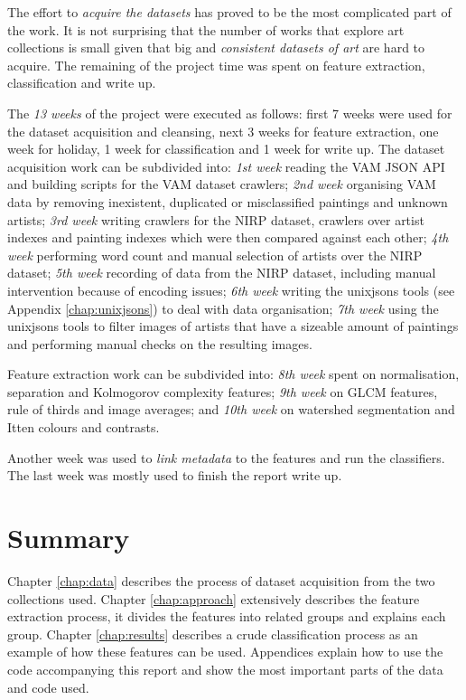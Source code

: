 \documentclass[11pt,a4paper,twoside,openright]{report}
\begin{document}
The effort to \emph{acquire the datasets} has proved to be the most complicated
part of the work.  It is not surprising that the number of works that explore
art collections is small given that big and \emph{consistent datasets of art}
are hard to acquire.  The remaining of the project time was spent on feature
extraction, classification and write up.

The \emph{13 weeks} of the project were executed as follows: first 7 weeks were
used for the dataset acquisition and cleansing, next 3 weeks for feature
extraction, one week for holiday, 1 week for classification and 1 week for
write up.  The dataset acquisition work can be subdivided into: \emph{1st week}
reading the VAM JSON API and building scripts for the VAM dataset crawlers;
\emph{2nd week} organising VAM data by removing inexistent, duplicated or
misclassified paintings and unknown artists;  \emph{3rd week} writing crawlers
for the NIRP dataset, crawlers over artist indexes and painting indexes which
were then compared against each other;  \emph{4th week} performing word count
and manual selection of artists over the NIRP dataset;  \emph{5th week}
recording of data from the NIRP dataset, including manual intervention because
of encoding issues;  \emph{6th week} writing the unixjsons tools (see Appendix
\ref{chap:unixjsons}) to deal with data organisation;  \emph{7th week} using
the unixjsons tools to filter images of artists that have a sizeable amount of
paintings and performing manual checks on the resulting images.

Feature extraction work can be subdivided into: \emph{8th week} spent on
normalisation, separation and Kolmogorov complexity features;  \emph{9th week}
on GLCM features, rule of thirds and image averages; and \emph{10th week} on
watershed segmentation and Itten colours and contrasts.

Another week was used to \emph{link metadata} to the features and run the
classifiers.  The last week was mostly used to finish the report write up.

\section{Summary}

Chapter \ref{chap:data} describes the process of dataset acquisition from the
two collections used.  Chapter \ref{chap:approach} extensively describes the
feature extraction process, it divides the features into related groups and
explains each group.  Chapter \ref{chap:results} describes a crude
classification process as an example of how these features can be used.
Appendices explain how to use the code accompanying this report and show the
most important parts of the data and code used.
\end{document}
